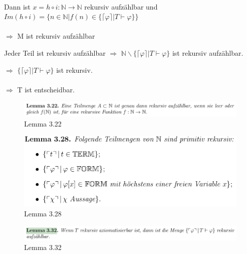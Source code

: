 \documentclass[a4paper]{scrartcl}%
\begin{document}
\begin{itemize}
\begin{itemize}
                    \\Dann ist $x = h \circ i: \mathds{N} \rightarrow \mathds{N}$ rekursiv aufzählbar und\\
                    $Im(h \circ i) = \{n \in \mathds{N} | f(n) \in \{\lceil \varphi \rceil | T \vdash \varphi\}\}$\\
                    \\$\Rightarrow$ M ist rekursiv aufzählbar\\
            \end{itemize}
            Jeder Teil ist rekursiv aufzählbar $\Rightarrow$ $\mathds{N} \backslash \{\lceil \varphi \rceil | T \vdash \varphi \}$ ist rekursiv aufzählbar.\\
    \end{itemize}
    $\Rightarrow$ $\{\lceil \varphi \rceil | T \vdash \varphi \}$ ist rekursiv.\\
    \\$\Rightarrow$ T ist entscheidbar.\

    

    \begin{figure}[H]
        \includegraphics[scale=0.3]{./L-3-22.png}
        \caption{Lemma 3.22}
        \label{fig:./L-3-22}
    \end{figure}
    \begin{figure}[H]
        \includegraphics[scale=0.3]{./L-3-28.png}
        \caption{Lemma 3.28}
        \label{fig:./L-3-28}
    \end{figure}
    \begin{figure}[H]
        \includegraphics[scale=0.3]{./L-3-32.png}
        \caption{Lemma 3.32}
        \label{fig:./L-3-32}
    \end{figure}
    
    
    
\end{document}
